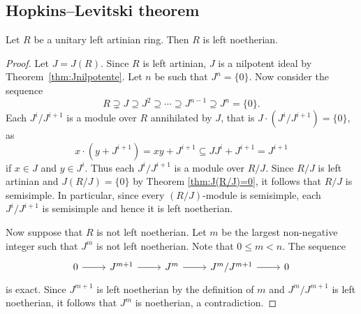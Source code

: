 


\subsection{Hopkins--Levitski theorem}

\begin{theorem}
	\label{thm:Hopkins-Levitski}
	Let $R$ be a unitary left artinian ring. Then $R$ is left noetherian.
\end{theorem}

\begin{proof}
	Let $J=J(R)$. Since $R$ is left artinian, $J$ is a nilpotent ideal 
	by Theorem~\ref{thm:Jnilpotente}. Let $n$ be such that $J^n=\{0\}$. Now consider the sequence 
	\[
		R\supsetneq J\supseteq J^2\supseteq\cdots\supseteq J^{n-1}\supseteq J^n=\{0\}.
	\]
	Each $J^{i}/J^{i+1}$ is a module over $R$ annihilated by $J$, 
	that is $J\cdot (J^i/J^{i+1})=\{0\}$, as 
	\[
	x\cdot (y+J^{i+1})=xy+J^{i+1}\subseteq JJ^i+J^{i+1}=J^{i+1} 
	\]
	if $x\in J$ and $y\in J^i$. 
	Thus each  
	$J^i/J^{i+1}$ is a module over $R/J$. Since $R/J$ is left artinian and 
	$J(R/J)=\{0\}$ by Theorem \ref{thm:J(R/J)=0}, it follows that $R/J$ is semisimple. 
	In particular, since every $(R/J)$-module is semisimple,  
	each $J^{i}/J^{i+1}$ 
	is semisimple and hence it is left noetherian. 
	
	Now suppose that $R$ is not left noetherian. Let $m$ be the largest non-negative integer
	such that $J^m$ is not left noetherian. Note that $0\leq m<n$. The sequence
	\[
	 \begin{tikzcd}
        0 & J^{m+1} & J^m & J^{m}/J^{m+1} & 0
        \arrow[from=1-1, to=1-2]
        \arrow[from=1-2, to=1-3]
        \arrow[from=1-3, to=1-4]
        \arrow[from=1-4, to=1-5]
    \end{tikzcd}
	\]
	is exact. Since $J^{m+1}$ is left noetherian by the definition of $m$ 
	and $J^m/J^{m+1}$ is left noetherian, it follows that 
	$J^m$ is noetherian, a contradiction. 
\end{proof}

